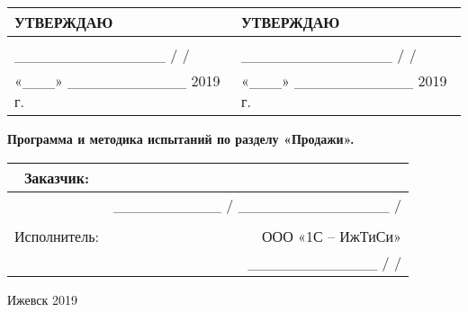 \begin{titlepage}

\large

\begin{tabular}{|l|l|}
	\hline
	УТВЕРЖДАЮ & УТВЕРЖДАЮ \\
	\hline
	&  \\
	\hline
	\_\_\_\_\_\_\_\_\_\_\_\_\_\_ /                                       / & \_\_\_\_\_\_\_\_\_\_\_\_\_\_ /                                       / \\
	\hline
	«\_\_\_» \_\_\_\_\_\_\_\_\_\_\_ 2019 г. & «\_\_\_» \_\_\_\_\_\_\_\_\_\_\_ 2019 г. \\
	\hline
\end{tabular}

\vspace{2.25cm}
\begin{center}
\textbf{Программа и методика испытаний 
	по разделу «Продажи». } 



\end{center}
\begin{tabular}{|c|r|}
	\hline
	Заказчик: &  \\
	\hline
	& \_\_\_\_\_\_\_\_\_\_ / \_\_\_\_\_\_\_\_\_\_\_\_\_\_ / \\
	\hline
	&  \\
	\hline
	Исполнитель: & ООО «1С – ИжТиСи» \\
	\hline
	& \_\_\_\_\_\_\_\_\_\_\_\_ /                                   / \\
	\hline

\end{tabular}



\begin{center}
Ижевск 2019
\end{center}
\end{titlepage}